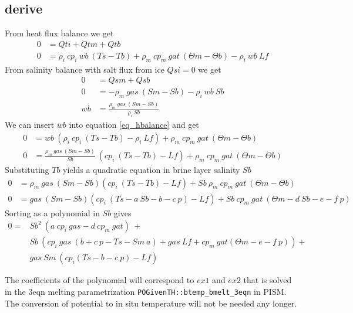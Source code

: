 \documentclass{article}
\begin{document}
\subsection{derive}
From heat flux balance we get
\begin{align}
0 &= Qti + Qtm + Qtb \\
0 &= \rho_i \ cp_i \ wb \ (Ts - Tb) + \rho_m \ cp_m \ gat \ (\Theta m- \Theta b) - \rho_i \ wb \ Lf
\label{eq_hbalance}
\end{align}
From salinity balance with salt flux from ice $Qsi = 0$ we get
\begin{align*}
0 &= Qsm + Qsb \\
0 &= - \rho_m \ gas \ (Sm-Sb) -\rho_i \ wb \ Sb \\
wb &= \frac{\rho_m \ gas \ (Sm-Sb)}{\rho_i \ Sb}
\end{align*}
We can insert $wb$ into equation \ref{eq_hbalance} and get
\begin{align}
0 &= wb \ (\rho_i \ cp_i \ (Ts - Tb) -  \rho_i \ Lf) + \rho_m \ cp_m \ gat \ (\Theta m- \Theta b) \\
0 &= \frac{\rho_m \ gas \ (Sm-Sb)}{Sb} \ (cp_i \ (Ts - Tb) -  Lf) + \rho_m \ cp_m \ gat \ (\Theta m- \Theta b)
\end{align}
Substituting $Tb$ yields a quadratic equation in brine layer salinity $Sb$
\begin{align*}
0 &= \rho_m \ gas \ (Sm-Sb) (cp_i \ (Ts - Tb) -  Lf) + Sb \ \rho_m \ cp_m \ gat \ (\Theta m- \Theta b) \\
0 &= gas \ (Sm-Sb)(cp_i \ (Ts - a \ Sb - b - c \ p) -  Lf) + Sb \ cp_m \ gat \ (\Theta m - d \ Sb - e - f \ p)
\end{align*}
Sorting as a polynomial in $Sb$ gives
\begin{align*}
0 = & Sb^2 \ (a \ cp_i \ gas - d \ cp_m \ gat) \ + \\
& Sb \ (cp_i \ gas \ (b + c \ p - Ts - Sm \ a) +gas \ Lf + cp_m \ gat(\Theta m-e-f \ p)) + \\
& gas \ Sm \ ( cp_i(Ts -b - c \ p) - Lf )
\end{align*}


The coefficients of the polynomial will correspond to $ex1$ and $ex2$ that is solved in the 3eqn melting parametrization \texttt{POGivenTH::btemp\_bmelt\_3eqn} in PISM.
The conversion of potential to in situ temperature will not be needed any longer.



\end{document}
